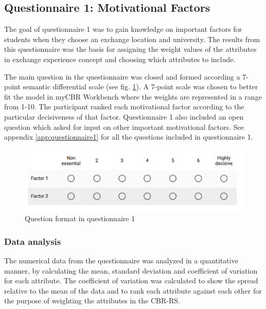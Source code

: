 \subsection{Questionnaire 1: Motivational Factors}\label{sec:questionnaire_1}

The goal of questionnaire 1 was to gain knowledge on important factors for students when they choose an exchange location and university. The results from this questionnaire was the basis for assigning the weight values of the attributes in exchange experience concept and choosing which attributes to include. 

The main question in the questionnaire was closed and formed according a 7-point semantic differential scale (see fig. \ref{fig:semantic_scale}). A 7-point scale was chosen to better fit the model in myCBR Workbench where the weights are represented in a range from 1-10. The participant ranked each motivational factor according to the particular decisiveness of that factor. Questionnaire 1 also included an open question which asked for input on other important motivational factors. See appendix \ref{app:questionnaire1} for all the questions included in questionnaire 1. 

\begin{figure}[h!]
    \centering
    \includegraphics[width=1\textwidth]{fig/question1.png}
    \caption{Question format in questionnaire 1}
    \label{fig:semantic_scale}
\end{figure}

\subsubsection{Data analysis}

The numerical data from the questionnaire was analyzed in a quantitative manner, by calculating the mean, standard deviation and coefficient of variation for each attribute. The coefficient of variation was calculated to show the spread relative to the mean of the data and to rank each attribute against each other for the purpose of weighting the attributes in the CBR-RS.

